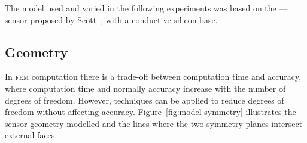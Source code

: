 \documentclass[a4paper,10pt,twocolumn]{article}
\newcommand{\fem}{\textsc{fem}\xspace}
\begin{document}
The model used and varied in the following experiments was based on the 
---- sensor proposed by Scott~\cite{scott2012600},
with a conductive silicon base.

\subsection{Geometry}

In \fem computation there is a trade-off between computation time and accuracy,
where computation time and normally accuracy increase with the number of degrees
of freedom. However, techniques can be applied to reduce degrees of freedom
without affecting accuracy. Figure~\ref{fig:model-symmetry} illustrates the
sensor geometry modelled and the lines where the two symmetry planes intersect
external faces.
\end{document}
